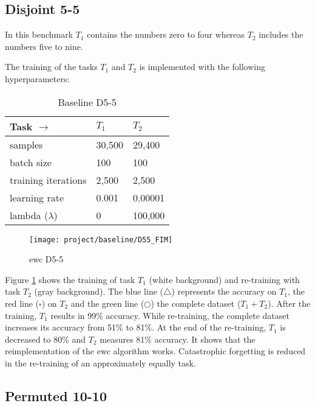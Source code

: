 \subsection{Disjoint 5-5}

In this benchmark $T_1$ contains the numbers zero to four whereas $T_2$ includes the numbers five to nine.

The training of the tasks $T_1$ and $T_2$ is implemented with the following hyperparameters:

\begin{table}[H]
    \centering
    \begin{tabular}{ |l|l|l|  }
        \hline
        Task $\to$ & $T_1$ & $T_2$ \\
        \hline\hline
        samples & 30,500 & 29,400 \\
        \hline
        batch size & 100 & 100 \\
        \hline
        training iterations & 2,500 & 2,500 \\
        \hline
        learning rate & 0.001 & 0.00001 \\
        \hline
        lambda ($\lambda$) & 0 & 100,000 \\
        \hline
    \end{tabular}
    \caption{Baseline D5-5}
    \label{table:base_d55}
\end{table}

\begin{figure}[H]
    \centering
    \texttt{[image: project/baseline/D55\_FIM]}
    \caption{\acrshort{ewc} D5-5}
    \label{fig:ewc_d5-5}
\end{figure}

Figure \ref{fig:ewc_d5-5} shows the training of task $T_1$ (white background) and re-training with task $T_2$ (gray background).
The blue line ($\triangle$) represents the accuracy on $T_1$, the red line ($\square$) on $T_2$ and the green line ($\bigcirc$) the complete dataset ($T_1 + T_2$).
After the training, $T_1$ results in 99\% accuracy.
While re-training, the complete dataset increases its accuracy from 51\% to 81\%.
At the end of the re-training, $T_1$ is decreased to 80\% and $T_2$ measures 81\% accuracy.
\newline
It shows that the reimplementation of the \acrshort{ewc} algorithm works.
Catastrophic forgetting is reduced in the re-training of an approximately equally task.

\subsection{Permuted 10-10}

